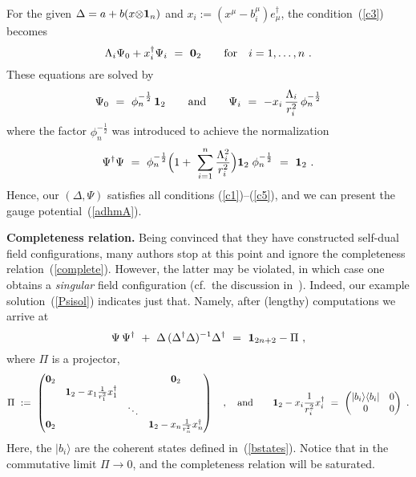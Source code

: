 \documentclass[a4paper,11pt]{article}
\numberwithin{equation}{section}
\def\La{\Lambda}
\def\sfrac#1#2{{\textstyle\frac{#1}{#2}}}
\def\>{\rangle}
\def\<{\langle}
\def\+{\dagger}
\begin{document}
{For the given $\Delta=a+b(x{\otimes}{\bf1}_n)$ 
and $x_i:=(x^\mu{-}b_i^\mu)e^\+_\mu$, the condition~(\ref{c3}) becomes
\begin{equation}
\La_i\Psi_0 + x_i^\+\Psi_i\ =\ {\bf0}_2 \qquad\textrm{for}\quad i=1,\ldots,n\ .
\end{equation}
These equations are solved by
\begin{equation} \label{Psisol}
\Psi_0\ =\ \phi_n^{-\frac12}\,{\bf1}_2 \qquad\textrm{and}\qquad
\Psi_i\ =\ -x_i\,\frac{\La_i}{r_i^2}\,\phi_n^{-\frac12}
\end{equation}
where the factor $\phi_n^{-\frac12}$ was introduced 
to achieve the normalization
\begin{equation}
\Psi^\+\Psi\ =\ \phi_n^{-\frac12}\Bigl(
1+\ \sum_{i=1}^n\frac{\La_i^2}{r_i^2} \Bigr){\bf1}_2\;\phi_n^{-\frac12}\ 
=\ {\bf1}_2\ .
\end{equation}
Hence, our $(\Delta,\Psi)$ satisfies all conditions (\ref{c1})--(\ref{c5}),
and we can present the gauge potential~(\ref{adhmA}).

\vfill\eject

\noindent
{\bf Completeness relation.}
Being convinced that they have constructed self-dual field configurations,
many authors stop at this point 
and ignore the completeness relation~(\ref{complete}).
However, the latter may be violated, in which case one obtains a 
{\it singular\/} field configuration (cf.~the discussion in~\cite{Chu:2001cx}).
Indeed, our example solution~(\ref{Psisol}) indicates just that.
Namely, after (lengthy) computations we arrive at
\begin{equation} \label{incomplete}
\Psi\,\Psi^\+\ +\ \Delta\,(\Delta^\+\Delta)^{-1}\Delta^\+\ 
=\ {\bf1}_{2n+2} - \Pi\ ,
\end{equation}
where $\Pi$ is a projector,
\begin{equation}
\Pi\ :=\ \begin{pmatrix}
{\bf0}_2 &         &        & {\bf0}_2 \\
         & {\bf1}_2-x_1\sfrac{1}{r_1^2}x_1^\+ &        &        \\
         &         & \ddots &          \\
{\bf0}_2 &         &        & {\bf1}_2-x_n\sfrac{1}{r_n^2}x_n^\+
\end{pmatrix}
\quad,\quad\textrm{and}\qquad
{\bf1}_2-x_i\frac{1}{r_i^2}x_i^\+\ =\ \begin{pmatrix}
|b_i\>\<b_i| & 0 \\ 0 & 0 \end{pmatrix}\ .
\end{equation}
Here, the $|b_i\>$ are the coherent states defined in~(\ref{bstates}).
Notice that in the commutative limit $\Pi\to0$, and the completeness
relation will be saturated.

}
\end{document}
